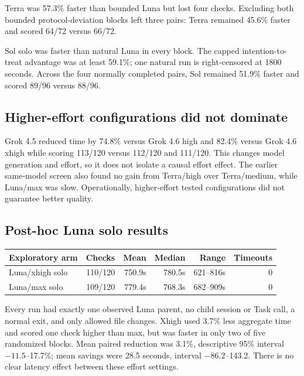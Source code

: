 \documentclass[11pt,oneside]{article}
\begin{document}
Terra was 57.3\% faster than bounded Luna but lost four checks. Excluding both
bounded protocol-deviation blocks left three pairs: Terra remained 45.6\%
faster and scored 64/72 versus 66/72.

Sol solo was faster than natural Luna in every block. The capped intention-to-
treat advantage was at least 59.1\%; one natural run is right-censored at 1800
seconds. Across the four normally completed pairs, Sol remained 51.9\% faster
and scored 89/96 versus 88/96.

\subsection{Higher-effort configurations did not dominate}

Grok 4.5 reduced time by 74.8\% versus Grok 4.6 high and 82.4\% versus Grok 4.6
xhigh while scoring 113/120 versus 112/120 and 111/120. This changes model
generation and effort, so it does not isolate a causal effort effect. The
earlier same-model screen also found no gain from Terra/high over Terra/medium,
while Luna/max was slow. Operationally, higher-effort tested configurations did
not guarantee better quality.

\subsection{Post-hoc Luna solo results}

\begin{center}
\begin{tabular}{@{}lrrrrr@{}}
\toprule
Exploratory arm & Checks & Mean & Median & Range & Timeouts \\
\midrule
Luna/xhigh solo & 110/120 & 750.9s & 780.5s & 621--816s & 0 \\
Luna/max solo & 109/120 & 779.4s & 768.3s & 682--909s & 0 \\
\bottomrule
\end{tabular}
\end{center}

Every run had exactly one observed Luna parent, no child session or Task call,
a normal exit, and only allowed file changes. Xhigh used 3.7\% less aggregate
time and scored one check higher than max, but was faster in only two of five
randomized blocks. Mean paired reduction was 3.1\%, descriptive 95\% interval
$-11.5$--17.7\%; mean savings were 28.5 seconds, interval $-86.2$--143.2.
There is no clear latency effect between these effort settings.
\end{document}
